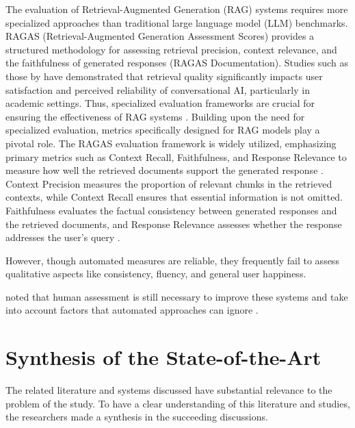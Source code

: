 \begin{refsection}
\hspace{0.4cm}The evaluation of Retrieval-Augmented Generation (RAG) systems requires more specialized approaches than traditional large language model (LLM) benchmarks. RAGAS (Retrieval-Augmented Generation Assessment Scores) provides a structured methodology for assessing retrieval precision, context relevance, and the faithfulness of generated responses (RAGAS Documentation). Studies such as those by \citeauthor{shuster2021retrieval} \citeyear{shuster2021retrieval} have demonstrated that retrieval quality significantly impacts user satisfaction and perceived reliability of conversational AI, particularly in academic settings. Thus, specialized evaluation frameworks are crucial for ensuring the effectiveness of RAG systems \cite{shuster2021retrieval}.
Building upon the need for specialized evaluation, metrics specifically designed for RAG models play a pivotal role. The RAGAS evaluation framework is widely utilized, emphasizing primary metrics such as Context Recall, Faithfulness, and Response Relevance to measure how well the retrieved documents support the generated response \cite{roychowdhury2024evaluation}.
Context Precision measures the proportion of relevant chunks in the retrieved contexts, while Context Recall ensures that essential information is not omitted. Faithfulness evaluates the factual consistency between generated responses and the retrieved documents, and Response Relevance assesses whether the response addresses the user's query \cite{aquino2024extracting} \cite{deepak2025langchain}.

\hspace{0.4cm}However, though automated measures are reliable, they frequently fail to assess qualitative aspects like consistency, fluency, and general user happiness.

\newpage
\clearpage
\citeauthor{sivasothy2024ragprobe} \citeyear{sivasothy2024ragprobe} noted that human assessment is still necessary to improve these systems and take into account factors that automated approaches can ignore \cite{sivasothy2024ragprobe}.

\section{Synthesis of the State-of-the-Art}

\hspace{1cm}The related literature and systems discussed have substantial relevance to the problem of the study. To have a clear understanding of this literature and studies, the researchers made a synthesis in the succeeding discussions.



\end{refsection}
